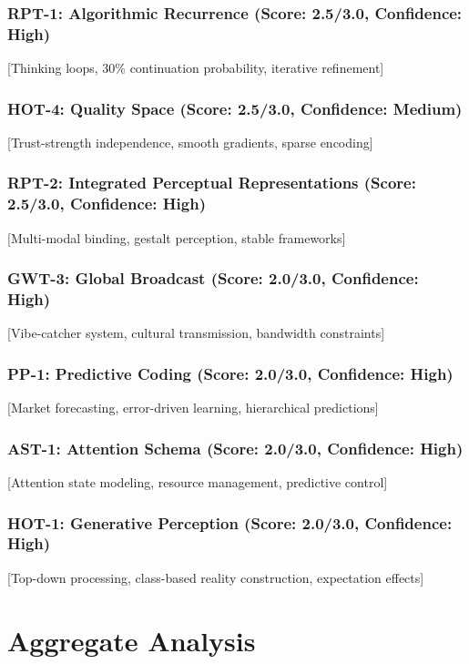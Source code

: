 \documentclass[12pt,a4paper]{article}
\begin{document}
\subsubsection{RPT-1: Algorithmic Recurrence (Score: 2.5/3.0, Confidence: High)}
[Thinking loops, 30\% continuation probability, iterative refinement]

\subsubsection{HOT-4: Quality Space (Score: 2.5/3.0, Confidence: Medium)}
[Trust-strength independence, smooth gradients, sparse encoding]

\subsubsection{RPT-2: Integrated Perceptual Representations (Score: 2.5/3.0, Confidence: High)}
[Multi-modal binding, gestalt perception, stable frameworks]

\subsubsection{GWT-3: Global Broadcast (Score: 2.0/3.0, Confidence: High)}
[Vibe-catcher system, cultural transmission, bandwidth constraints]

\subsubsection{PP-1: Predictive Coding (Score: 2.0/3.0, Confidence: High)}
[Market forecasting, error-driven learning, hierarchical predictions]

\subsubsection{AST-1: Attention Schema (Score: 2.0/3.0, Confidence: High)}
[Attention state modeling, resource management, predictive control]

\subsubsection{HOT-1: Generative Perception (Score: 2.0/3.0, Confidence: High)}
[Top-down processing, class-based reality construction, expectation effects]

\section{Aggregate Analysis}
\end{document}
